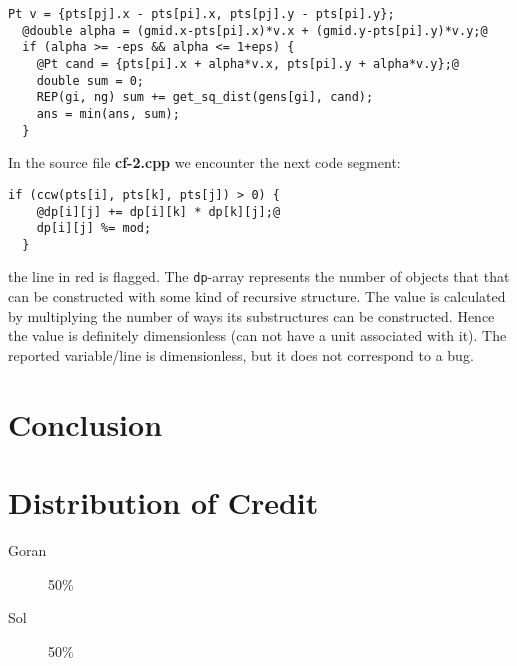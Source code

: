 \documentclass[12pt]{article}
\begin{document}
\begin{lstlisting}[label=proposal-full.cpp]
  Pt v = {pts[pj].x - pts[pi].x, pts[pj].y - pts[pi].y};
  @double alpha = (gmid.x-pts[pi].x)*v.x + (gmid.y-pts[pi].y)*v.y;@
  if (alpha >= -eps && alpha <= 1+eps) {
    @Pt cand = {pts[pi].x + alpha*v.x, pts[pi].y + alpha*v.y};@
    double sum = 0;
    REP(gi, ng) sum += get_sq_dist(gens[gi], cand);
    ans = min(ans, sum);
  }  
\end{lstlisting}

In the source file \textbf{cf-2.cpp} we encounter the next code segment:
\begin{lstlisting}[label=cf-2.cpp]
  if (ccw(pts[i], pts[k], pts[j]) > 0) {
    @dp[i][j] += dp[i][k] * dp[k][j];@
    dp[i][j] %= mod;
  }
\end{lstlisting}
the line in red is flagged.
The \texttt{dp}-array represents the number of objects that that can be constructed with some kind of recursive structure.
The value is calculated by multiplying the number of ways its substructures can be constructed.
Hence the value is definitely dimensionless (can not have a unit associated with it).
The reported variable/line is dimensionless, but it does not correspond to a bug.

\section{Conclusion}

\section{Distribution of Credit}
\begin{description}
  \item[Goran] 50\%
    \item[Sol] 50\%
\end{description}



\end{document}
